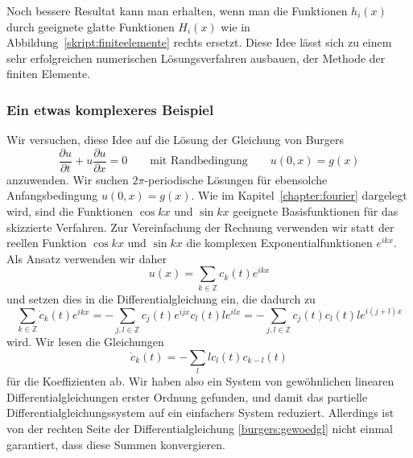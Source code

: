 Noch bessere Resultat kann man erhalten, wenn man die Funktionen
$h_i(x)$ durch geeignete glatte Funktionen $H_i(x)$ wie in
Abbildung~\ref{skript:finiteelemente} rechts ersetzt.
Diese Idee lässt sich zu einem sehr erfolgreichen numerischen
Lösungsverfahren ausbauen, der Methode der finiten Elemente.

\subsubsection{Ein etwas komplexeres Beispiel\label{subsubsection:komplexeres}}
Wir versuchen, diese Idee auf die Lösung der Gleichung von
Burgers
\begin{equation}
\frac{\partial u}{\partial t} + u\frac{\partial u}{\partial x}=0
\qquad\text{mit Randbedingung}\qquad
u(0,x)=g(x)
\label{skript:pde:burgersequation}
\end{equation}
anzuwenden.
Wir suchen $2\pi$-periodische Lösungen für ebensolche Anfangsbedingung
$u(0,x)=g(x)$.
Wie im Kapitel~\ref{chapter:fourier} dargelegt wird, sind die Funktionen
$\cos kx$ und $\sin kx$ geeignete Basisfunktionen für das skizzierte Verfahren.
Zur Vereinfachung der Rechnung verwenden wir statt der reellen Funktion
$\cos kx$ und $\sin kx$ die komplexen Exponentialfunktionen $e^{ikx}$.
Als Ansatz verwenden wir daher
\[
u(x) = \sum_{k\in\mathbb Z} c_k(t) e^{ikx}
\]
und setzen dies in die Differentialgleichung ein, die dadurch zu
\[
\sum_{k\in\mathbb Z} \dot c_k(t) e^{ikx}
=
-\sum_{j,l\in\mathbb Z} c_j(t)e^{ijx} c_l(t) le^{ilx}
=
-\sum_{j,l\in\mathbb Z} c_j(t)c_l(t) le^{i(j+l)x}
\]
wird.
Wir lesen die Gleichungen
\begin{equation}
\dot c_k(t) = -\sum_{l} lc_l(t)c_{k-l}(t)
\label{burgers:gewoedgl}
\end{equation}
für die Koeffizienten ab.
Wir haben also ein System von gewöhnlichen linearen Differentialgleichungen
erster Ordnung gefunden, und damit das partielle Differentialgleichungssystem
auf ein einfachers System reduziert.
Allerdings ist von der rechten Seite der Differentialgleichung
\eqref{burgers:gewoedgl}
nicht einmal garantiert, dass diese Summen konvergieren.

